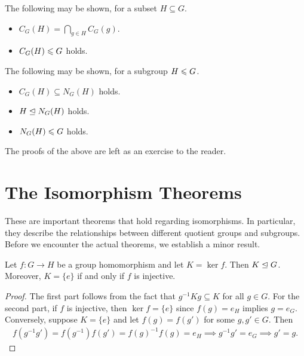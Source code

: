 \begin{remark}
    The following may be shown, for a subset $H \subseteq G$.
    \begin{itemize}
        \item $C_{G}(H) = \bigcap_{g \in H} C_{G}(g)$.
        \item $C_{G}(H) \leqslant G$ holds.
    \end{itemize}
    The following may be shown, for a subgroup $H \leqslant G$.
    \begin{itemize}
        \item $C_{G}(H) \subseteq N_{G}(H)$ holds.
        \item $H \trianglelefteq N_{G}(H)$ holds.
        \item $N_{G}(H) \leqslant G$ holds.
    \end{itemize}
\end{remark}

The proofs of the above are left as an exercise to the reader.

\section{The Isomorphism Theorems}

These are important theorems that hold regarding isomorphisms. In particular, they describe the relationships between different quotient groups and subgroups. Before we encounter the actual theorems, we establish a minor result.

\begin{proposition}
    Let $f:G \to H$ be a group homomorphism and let $K = \ker f$. Then $K \trianglelefteq G$. Moreover, $K = \{e\}$ if and only if $f$ is injective.
\end{proposition}
\begin{proof}
    The first part follows from the fact that $g^{-1}Kg \subseteq K$ for all $g \in G$. For the second part, if $f$ is injective, then $\ker f = \{e\}$ since $f(g) = e_{H}$ implies $g = e_{G}$. Conversely, suppose $K = \{e\}$ and let $f(g) = f(g')$ for some $g,g' \in G$. Then
    \begin{align}
        f(g^{-1}g') = f(g^{-1})f(g') = f(g)^{-1}f(g) = e_{H} \implies g^{-1}g' = e_{G} \implies g' = g.
    \end{align}
\end{proof}


